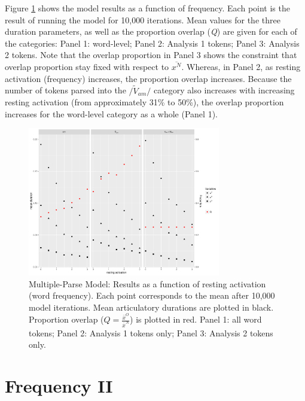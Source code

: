 Figure \ref{fig:Multiple-Parse-Results} shows the model results as
a function of frequency. Each point is the result of running the model
for 10,000 iterations. Mean values for the three duration parameters,
as well as the proportion overlap (\emph{Q}) are given for each of
the categories: Panel 1: word-level; Panel 2: Analysis 1 tokens; Panel
3: Analysis 2 tokens. Note that the overlap proportion in Panel 3
shows the constraint that overlap proportion stay fixed with respect
to $\overline{x^{N}}$. Whereas, in Panel 2, as resting activation
(frequency) increases, the proportion overlap increases. Because the
number of tokens parsed into the $/\tilde{V}_{am}/$ category also
increases with increasing resting activation (from approximately 31\%
to 50\%), the overlap proportion increases for the word-level category
as a whole (Panel 1). 

\begin{figure}[H]
\includegraphics[width=0.75\textwidth]{figures/MultipleParseResults.pdf}\caption{\label{fig:Multiple-Parse-Results}Multiple-Parse Model: Results as
a function of resting activation (word frequency). Each point corresponds
to the mean after 10,000 model iterations. Mean articulatory durations
are plotted in black. Proportion overlap ($Q=\frac{\bar{x}^{O}}{\bar{x}^{N}}$)
is plotted in red. Panel 1: all word tokens; Panel 2: Analysis 1 tokens
only; Panel 3: Analysis 2 tokens only.}
\end{figure}


\section{\label{sec:Frequency-II}Frequency II}

